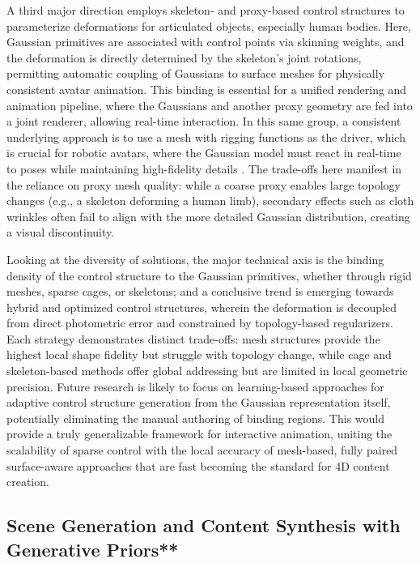 \documentclass[11pt,a4paper]{article}
\begin{document}
A third major direction employs skeleton- and proxy-based control structures to parameterize deformations for articulated objects, especially human bodies. Here, Gaussian primitives are associated with control points via skinning weights, and the deformation is directly determined by the skeleton's joint rotations, permitting automatic coupling of Gaussians to surface meshes for physically consistent avatar animation. This binding is essential for a unified rendering and animation pipeline, where the Gaussians and another proxy geometry are fed into a joint renderer, allowing real-time interaction. In this same group, a consistent underlying approach is to use a mesh with rigging functions as the driver, which is crucial for robotic avatars, where the Gaussian model must react in real-time to poses while maintaining high-fidelity details \cite{arxiv:2412.00905v2}. The trade-offs here manifest in the reliance on proxy mesh quality: while a coarse proxy enables large topology changes (e.g., a skeleton deforming a human limb), secondary effects such as cloth wrinkles often fail to align with the more detailed Gaussian distribution, creating a visual discontinuity.

Looking at the diversity of solutions, the major technical axis is the binding density of the control structure to the Gaussian primitives, whether through rigid meshes, sparse cages, or skeletons; and a conclusive trend is emerging towards hybrid and optimized control structures, wherein the deformation is decoupled from direct photometric error and constrained by topology-based regularizers. Each strategy demonstrates distinct trade-offs: mesh structures provide the highest local shape fidelity but struggle with topology change, while cage and skeleton-based methods offer global addressing but are limited in local geometric precision. Future research is likely to focus on learning-based approaches for adaptive control structure generation from the Gaussian representation itself, potentially eliminating the manual authoring of binding regions. This would provide a truly generalizable framework for interactive animation, uniting the scalability of sparse control with the local accuracy of mesh-based, fully paired surface-aware approaches that are fast becoming the standard for 4D content creation.


\subsection{Scene Generation and Content Synthesis with Generative Priors**}
\end{document}
